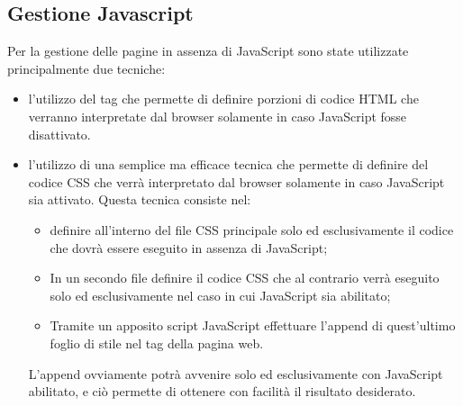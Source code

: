 \documentclass[12pt]{article}
\begin{document}
	\subsection{Gestione Javascript}
	Per la gestione delle pagine in assenza di JavaScript sono state utilizzate principalmente due tecniche:
	\begin{itemize}
			\item l'utilizzo del tag  che permette di definire porzioni di codice HTML che verranno interpretate dal browser solamente in caso JavaScript fosse disattivato.
			\item l'utilizzo di una semplice ma efficace tecnica che permette di definire del codice CSS che verrà interpretato dal browser solamente in caso JavaScript sia attivato. Questa tecnica consiste nel:
			\begin{itemize}
				\item definire all'interno del file CSS principale solo ed esclusivamente il codice che dovrà essere eseguito in assenza di JavaScript;
				\item In un secondo file definire il codice CSS che al contrario verrà eseguito solo ed esclusivamente nel caso in cui JavaScript sia abilitato;
				\item Tramite un apposito script JavaScript effettuare l'append di quest'ultimo foglio di stile nel tag  della pagina web.
			\end{itemize}
			L'append ovviamente potrà avvenire solo ed esclusivamente con JavaScript abilitato, e ciò permette di ottenere con facilità il risultato desiderato.
	\end{itemize}
\end{document}
